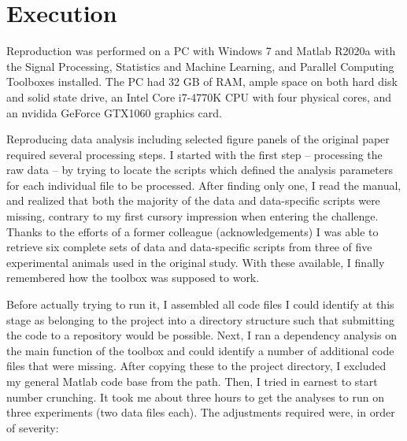 \section{Execution}

Reproduction was performed on a PC with Windows 7 and Matlab R2020a with the Signal Processing, Statistics and Machine Learning, and Parallel Computing Toolboxes installed. The PC had 32 GB of RAM, ample space on both hard disk and solid state drive, an Intel Core i7-4770K CPU with four physical cores, and an nvidida GeForce GTX1060 graphics card.

Reproducing data analysis including selected figure panels of the original paper required several processing steps. 
I started with the first step -- processing the raw data -- by trying to locate the scripts which defined the analysis parameters for each individual file to be processed. After finding only one, I read the manual, and realized that both the majority of the data and data-specific scripts were missing, contrary to my first cursory impression when entering the challenge. Thanks to the efforts of a former colleague (acknowledgements) I was able to retrieve six complete sets of data and data-specific scripts from three of five experimental animals used in the original study. With these available, I finally remembered how the toolbox was supposed to work.

Before actually trying to run it, I assembled all code files I could identify at this stage as belonging to the project into a directory structure such that submitting the code to a repository would be possible. Next, I ran a dependency analysis on the main function of the toolbox and could identify a number of additional code files that were missing. After copying these to the project directory, I excluded my general Matlab code base from the path. Then, I tried in earnest to start number crunching. It took me about three hours to get the analyses to run on three experiments (two data files each). The adjustments required were, in order of severity:

